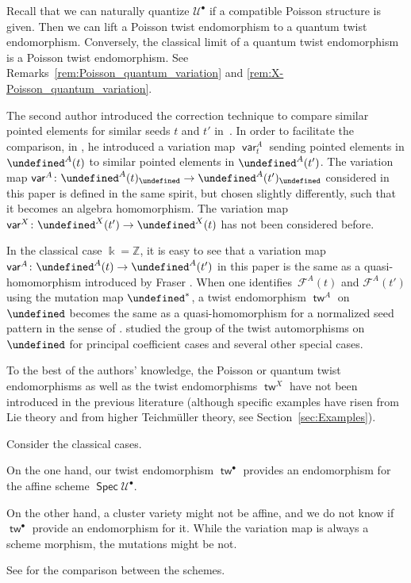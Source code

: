 \documentclass[10pt,a4paper]{amsart}
\newcommand{\kk}{\Bbbk}
\newcommand{\Z}{\mathbb{Z}}
\newcommand{\Q}{\mathbb{Q}}
\renewcommand{\tilde}[1]{\widetilde{#1}}
\newcommand{\opname}[1]{\operatorname{\mathsf{#1}}}
\newcommand{\Spec}{\operatorname{\mathsf{Spec}}}
\newcommand{\cF}{{\mathcal F}}
\newcommand{\cU}{{\mathcal U}}
\newcommand{\tw}{{\tilde{w}}}
\newcommand{\var}{\opname{var}}
\let\upClAlg\undefined
\let\LP\undefined
\let\fFac\undefined
\let\fFacRoot\undefined
\let\seq\undefined
\renewcommand{\tw}{\opname{tw}}
\newcommand{\upClAlg}{\mathcal{U}^A}
\newcommand{\LP}{{\mathcal{LP}}}
\newcommand{\fFac}{\mathcal{Z}}
\newcommand{\fFacRoot}{\fFac^{\Q}}
\newcommand{\seq}{\boldsymbol{\mu}}%
\renewcommand{\tw}{\opname{tw}}
\numberwithin{equation}{section}
\begin{document}
Recall that we can naturally quantize $\cU^{\bullet}$ if a compatible Poisson
structure is given. Then we can lift a Poisson twist endomorphism
to a quantum twist endomorphism. Conversely, the classical limit of a quantum twist endomorphism is a Poisson twist endomorphism. See Remarks~\ref{rem:Poisson_quantum_variation} and \ref{rem:X-Poisson_quantum_variation}.

\begin{Remark}
The second author introduced the correction technique to compare similar
pointed elements for similar seeds $t$ and $t'$ in~\cite{Qin12}.
In order to facilitate the comparison, in \cite{qin2017triangular},
he introduced a variation map $\var_{t}^{A}$ sending pointed elements
in $\LP^{A}(t)$ to similar pointed elements in $\LP^{A}(t')$. The
variation map $\var^{A}\colon\LP^{A}(t)_{\fFacRoot}\rightarrow\LP^{A}(t')_{\fFacRoot}$
considered in this paper is defined in the same spirit, but chosen
slightly differently, such that it becomes an algebra homomorphism.
The variation map $\var^{X}\colon\LP^{X}(t')\rightarrow\LP^{X}(t)$ has
not been considered before.

In the classical case $\kk=\Z$, it is easy to see that a variation map $\var^{A}\colon\LP^{A}(t)\rightarrow\LP^{A}(t')$
in this paper is the same as a quasi-homomorphism introduced by Fraser
\cite{fraser2016quasi}. When one identifies~$\cF^{A}(t)$
and $\cF^{A}(t')$ using the mutation map $\seq^{*}$, a twist endomorphism
$\tw^{A}$ on $\upClAlg$ becomes the same as a quasi-homomorphism
for a normalized seed pattern in the sense of \cite{fraser2016quasi}. \cite{chang2019cluster} studied the group of the twist automorphisms
on $\upClAlg$ for principal coefficient cases and several other special
cases.

To the best of the authors' knowledge, the Poisson or quantum twist endomorphisms
as well as the twist endomorphisms $\tw^{X}$ have not been introduced
in the previous literature (although specific examples have risen
from Lie theory and from higher Teichm\"uller theory, see Section~\ref{sec:Examples}).
\end{Remark}

\begin{Remark}
Consider the classical cases.

On the one hand, our twist endomorphism $\tw^{\bullet}$ provides
an endomorphism for the affine scheme $\Spec\cU^{\bullet}$.

On the other hand, a cluster variety might not be affine, and we do
not know if $\tw^{\bullet}$ provide an endomorphism for it. While
the variation map is always a scheme morphism, the mutations might
be not.

See \cite{gross2013birational} for the comparison between the schemes.
\end{Remark}
\end{document}
